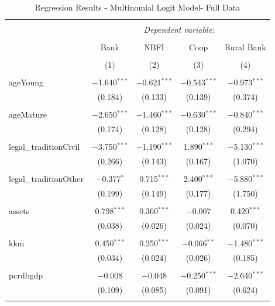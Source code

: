 \documentclass[a4paper, nobind]{templates/ociamthesis}
\begin{document}
\begin{table}[!htbp] \centering 
  \caption{Regression Results - Multinomial Logit Model- Full Data} 
  \label{} 
\footnotesize 
\begin{tabular}{@{\extracolsep{5pt}}lcccc} 
\\[-1.8ex]\hline 
\hline \\[-1.8ex] 
 & \multicolumn{4}{c}{\textit{Dependent variable:}} \\ 
\cline{2-5} 
\\[-1.8ex] & Bank & NBFI & Coop & Rural Bank \\ 
\\[-1.8ex] & (1) & (2) & (3) & (4)\\ 
\hline \\[-1.8ex] 
 ageYoung & $-$1.640$^{***}$ & $-$0.621$^{***}$ & $-$0.543$^{***}$ & $-$0.973$^{***}$ \\ 
  & (0.184) & (0.133) & (0.139) & (0.374) \\ 
  & & & & \\ 
 ageMature & $-$2.650$^{***}$ & $-$1.460$^{***}$ & $-$0.630$^{***}$ & $-$0.840$^{***}$ \\ 
  & (0.174) & (0.128) & (0.128) & (0.294) \\ 
  & & & & \\ 
 legal\_traditionCivil & $-$3.750$^{***}$ & $-$1.190$^{***}$ & 1.890$^{***}$ & $-$5.130$^{***}$ \\ 
  & (0.266) & (0.143) & (0.167) & (1.070) \\ 
  & & & & \\ 
 legal\_traditionOther & $-$0.377$^{*}$ & 0.715$^{***}$ & 2.400$^{***}$ & $-$5.880$^{***}$ \\ 
  & (0.199) & (0.149) & (0.177) & (1.750) \\ 
  & & & & \\ 
 assets & 0.798$^{***}$ & 0.360$^{***}$ & $-$0.007 & 0.420$^{***}$ \\ 
  & (0.038) & (0.026) & (0.024) & (0.070) \\ 
  & & & & \\ 
 kkm & 0.450$^{***}$ & 0.250$^{***}$ & $-$0.066$^{**}$ & $-$1.480$^{***}$ \\ 
  & (0.034) & (0.024) & (0.026) & (0.185) \\ 
  & & & & \\ 
 pcrdbgdp & $-$0.008 & $-$0.048 & $-$0.250$^{***}$ & $-$2.640$^{***}$ \\ 
  & (0.109) & (0.085) & (0.091) & (0.624) \\ 
  & & & & \\ 

\end{tabular}
\end{table}
\end{document}
